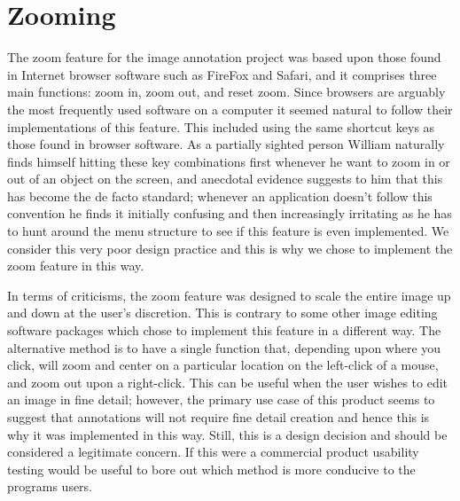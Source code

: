 \section{Zooming}
The zoom feature for the image annotation project was based upon those found in Internet browser software such as FireFox and Safari, and it comprises three main functions: zoom in, zoom out, and reset zoom.  Since browsers are arguably the most frequently used software on a computer it seemed natural to follow their implementations of this feature.  This included using the same shortcut keys as those found in browser software.  As a partially sighted person William naturally finds himself hitting these key combinations first whenever he want to zoom in or out of an object on the screen, and anecdotal evidence suggests to him that this has become the de facto standard; whenever an application doesn’t follow this convention he finds it initially confusing and then increasingly irritating as he has to  hunt around the menu structure to see if this feature is even implemented.  We consider this very poor design practice and this is why we chose to implement the zoom feature in this way.

In terms of criticisms, the zoom feature was designed to scale the entire image up and down at the user’s discretion.  This is contrary to some other image editing software packages which chose to implement this feature in a different way.  The alternative method is to have a single function that, depending upon where you click, will zoom and center on a particular location on the left-click of a mouse, and zoom out upon a right-click.  This can be useful when the user wishes to edit an image in fine detail; however, the primary use case of this product seems to suggest that annotations will not require fine detail creation and hence this is why it was implemented in this way.  Still, this is a design decision and should be considered a legitimate concern.  If this were a commercial product usability testing would be useful to bore out which method is more conducive to the programs users.
